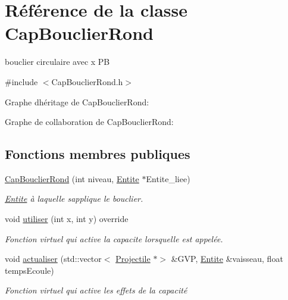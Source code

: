 \hypertarget{class_cap_bouclier_rond}{}\section{Référence de la classe Cap\+Bouclier\+Rond}
\label{class_cap_bouclier_rond}


bouclier circulaire avec x PB  




{\ttfamily \#include $<$Cap\+Bouclier\+Rond.\+h$>$}



Graphe d\textquotesingle{}héritage de Cap\+Bouclier\+Rond\+:


Graphe de collaboration de Cap\+Bouclier\+Rond\+:
\subsection*{Fonctions membres publiques}
\begin{DoxyCompactItemize}
\item 
\hyperlink{class_cap_bouclier_rond_aec1b654b05d75943664c3d95ad2407ac}{Cap\+Bouclier\+Rond} (int niveau, \hyperlink{class_entite}{Entite} $\ast$Entite\+\_\+liee)
\begin{DoxyCompactList}\small\item\em \hyperlink{class_entite}{Entite} à laquelle s\textquotesingle{}applique le bouclier. \end{DoxyCompactList}\item 
void \hyperlink{class_cap_bouclier_rond_a058b65433ae77666bc6b64d787b455fb}{utiliser} (int x, int y) override
\begin{DoxyCompactList}\small\item\em Fonction virtuel qui active la capacite lorsqu\textquotesingle{}elle est appelée. \end{DoxyCompactList}\item 
void \hyperlink{class_cap_bouclier_rond_a4b272fe8aece56cb0e0ba7bf21b9d574}{actualiser} (std\+::vector$<$ \hyperlink{class_projectile}{Projectile} $\ast$$>$ \&G\+VP, \hyperlink{class_entite}{Entite} \&vaisseau, float temps\+Ecoule)
\begin{DoxyCompactList}\small\item\em Fonction virtuel qui active les effets de la capacité \end{DoxyCompactList}\end{DoxyCompactItemize}
